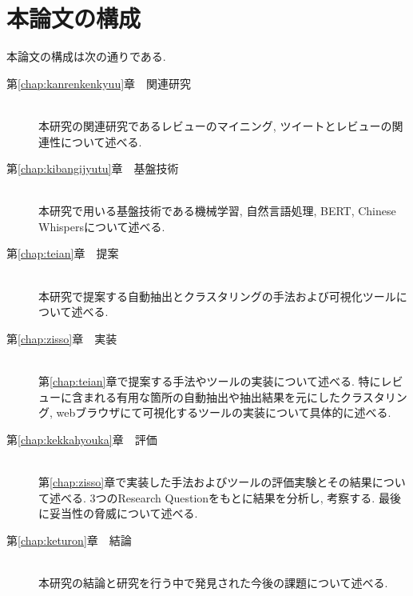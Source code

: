 \section{本論文の構成}
本論文の構成は次の通りである. 
\begin{description}

\item[第\ref{chap:kanrenkenkyuu}章　関連研究]\mbox{}\\
本研究の関連研究であるレビューのマイニング, ツイートとレビューの関連性について述べる. \\

\item[第\ref{chap:kibangijyutu}章　基盤技術]\mbox{}\\
本研究で用いる基盤技術である機械学習, 自然言語処理, BERT, Chinese Whispersについて述べる. \\

\item[第\ref{chap:teian}章　提案]\mbox{}\\
本研究で提案する自動抽出とクラスタリングの手法および可視化ツールについて述べる. \\

\item[第\ref{chap:zisso}章　実装]\mbox{}\\
第\ref{chap:teian}章で提案する手法やツールの実装について述べる. 特にレビューに含まれる有用な箇所の自動抽出や抽出結果を元にしたクラスタリング, webブラウザにて可視化するツールの実装について具体的に述べる. \\

\item[第\ref{chap:kekkahyouka}章　評価]\mbox{}\\
第\ref{chap:zisso}章で実装した手法およびツールの評価実験とその結果について述べる. 3つのResearch Questionをもとに結果を分析し, 考察する. 最後に妥当性の脅威について述べる. \\

\item[第\ref{chap:keturon}章　結論]\mbox{}\\
本研究の結論と研究を行う中で発見された今後の課題について述べる. \\

\end{description}